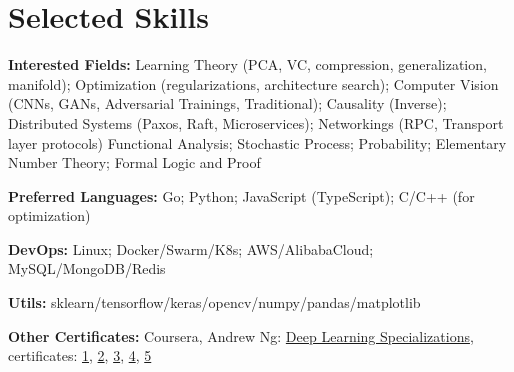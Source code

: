 \section{\textbf{Selected Skills}}
\resumeSubHeadingListStart
\item{
  \textbf{Interested Fields:}{ 
    \resumeItemListStart
       { Learning Theory (PCA, VC, compression, generalization, manifold); Optimization (regularizations, architecture search); Computer Vision (CNNs, GANs, Adversarial Trainings, Traditional); Causality (Inverse); }
       { Distributed Systems (Paxos, Raft, Microservices); Networkings (RPC, Transport layer protocols)}
       { Functional Analysis; Stochastic Process; Probability; Elementary Number Theory; Formal Logic and Proof}
   \resumeItemListEnd
  }
}
\item{
  \textbf{Preferred Languages:}{ Go; Python; JavaScript (TypeScript); C/C++ (for optimization)}
}
\item{
 \textbf{DevOps:}{ Linux; Docker/Swarm/K8s; AWS/AlibabaCloud; MySQL/MongoDB/Redis }
}
\item{
 \textbf{Utils:}{ sklearn/tensorflow/keras/opencv/numpy/pandas/matplotlib}
}

\item{
 \textbf{Other Certificates:}{
  Coursera, Andrew Ng: \href{https://www.coursera.org/account/accomplishments/specialization/QGH8ZVJ6J2L2}{Deep Learning Specializations}, certificates:
  \href{https://www.coursera.org/account/accomplishments/verify/YH4NT7HHN263}{1}, 
  \href{https://www.coursera.org/account/accomplishments/verify/QGH3GNGF6BM4}{2}, 
  \href{https://www.coursera.org/account/accomplishments/verify/6VU45R2SZEF6}{3},
  \href{https://www.coursera.org/account/accomplishments/verify/LF3K9BQQDLVL}{4},
  \href{https://www.coursera.org/account/accomplishments/verify/JQFLW2DPYAGW}{5}
 }
}
\resumeSubHeadingListEnd